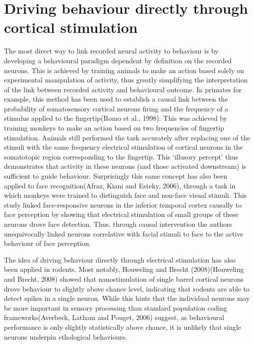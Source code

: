\section{Driving behaviour directly through cortical stimulation}

The most direct way to link recorded neural activity to behaviour is by developing a behavioural paradigm dependent by definition on the recorded neurons. This is achieved by training animals to make an action based solely on experimental manipulation of activity, thus greatly simplifying the interpretation of the link between recorded activity and behavioural outcome. In primates for example, this method has been used to establish a causal link between the probability of somatosensory cortical neurons firing and the frequency of a stimulus applied to the fingertip(Romo et al., 1998). This was achieved by training monkeys to make an action based on two frequencies of fingertip stimulation. Animals still performed the task accurately after replacing one of the stimuli with the same frequency electrical stimulation of cortical neurons in the somatotopic region corresponding to the fingertip. This ‘illusory percept’ thus demonstrates that activity in these neurons (and those activated downstream) is sufficient to guide behaviour. Surprisingly this same concept has also been applied to face recognition(Afraz, Kiani and Esteky, 2006), through a task in which monkeys were trained to distinguish face and non-face visual stimuli. This study linked face-responsive neurons in the inferior temporal cortex causally to face perception by showing that electrical stimulation of small groups of these neurons drove face detection. Thus, through causal intervention the authors unequivocally linked neurons correlative with facial stimuli to face to the active behaviour of face perception.

The idea of driving behaviour directly through electrical stimulation has also been applied in rodents. Most notably, Houweling and Brecht (2008)(Houweling and Brecht, 2008) showed that nanostimulation of single barrel cortical neurons drove behaviour to slightly above chance level, indicating that rodents are able to detect spikes in a single neuron. While this hints that the individual neurons may be more important in sensory processing than standard population coding frameworks(Averbeck, Latham and Pouget, 2006) suggest, as behavioural performance is only slightly statistically above chance, it is unlikely that single neurons underpin ethological behaviours.

